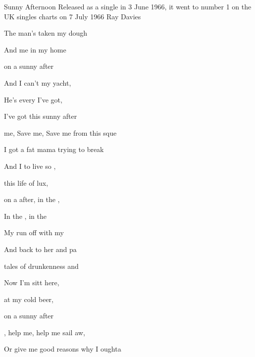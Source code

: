\begin{SBSong}{Sunny Afternoon}
  {Released as a single in 3 June 1966, it went to number 1 on the UK singles charts on 7 July 1966}
  {Ray Davies}
  \begin{SBVerse}
    The  man's taken  my dough
    
    And  me in my  home
    
     on a sunny after
    
    And I can't  my yacht,
    
    He's  every I've got,
    
     I've got this sunny after
  \end{SBVerse}
  \begin{SBChorus}
     me, Save me, Save me from this sque
    
    I got a  fat mama trying to break  
    
    And I  to live so ,
    
     this life of lux, 
    
     on a  after, in the ,
    
    In the , in the  
  \end{SBChorus}
  
  \begin{SBVerse}
    My  run off with my  
    
    And  back to her  and pa
    
     tales of drunkenness and 
    
    Now I'm sitt here,
    
     at my  cold beer,
    
     on a sunny after
  \end{SBVerse}
  \CBPageBrk
  \begin{SBChorus}
    , help me, help me sail aw,
    
    Or give me  good reasons why I oughta  
    

\end{SBChorus}
\end{SBSong}
